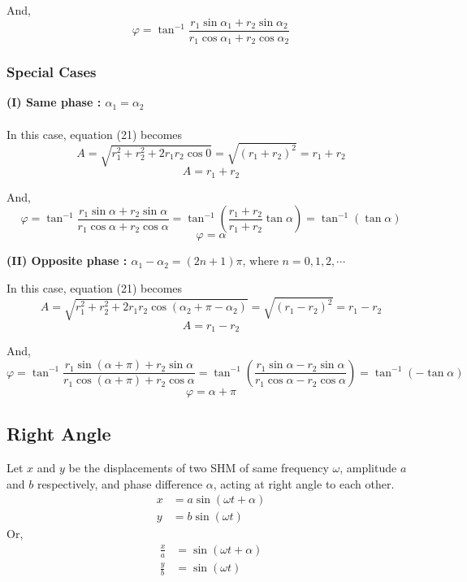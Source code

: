 \documentclass[12pt]{article}
\begin{document}
And,
\begin{equation}
    \boxed{ \varphi = \tan^{-1}{\frac{r_1 \sin{\alpha_1} + r_2 \sin{\alpha_2}}{r_1 \cos{\alpha_1} + r_2 \cos{\alpha_2}}} }
\end{equation}

\subsubsection{Special Cases}
\textbf{(I) Same phase : $\alpha_1 = \alpha_2$}\\~\\

In this case, equation (21) becomes \[
    A = \sqrt{r_1^2 + r_2^2 + 2r_1r_2 \cos{0}} = \sqrt{(r_1 + r_2)^2} = r_1 + r_2
\]
\begin{equation}
    \boxed{ A = r_1 + r_2 }
\end{equation}

And, \[
    \varphi = \tan^{-1}{\frac{r_1 \sin{\alpha} + r_2 \sin{\alpha}}{r_1 \cos{\alpha} + r_2 \cos{\alpha}}} = \tan^{-1}{\left( \frac{r_1 + r_2}{r_1 + r_2} \tan{\alpha} \right)} = \tan^{-1}{(\tan{\alpha})}
\]
\begin{equation}
    \boxed{ \varphi = \alpha }
\end{equation}

\textbf{(II) Opposite phase : $\alpha_1 - \alpha_2 = (2n+1)\pi \text{, where } n=0,1,2,\cdots$}

In this case, equation (21) becomes \[
    A = \sqrt{r_1^2 + r_2^2 + 2r_1r_2 \cos{(\alpha_2 + \pi - \alpha_2)}} = \sqrt{(r_1 - r_2)^2} = r_1 - r_2
\]
\begin{equation}
    \boxed{ A = r_1 - r_2 }
\end{equation}

And, \[
    \varphi = \tan^{-1}{\frac{r_1 \sin{(\alpha + \pi)} + r_2 \sin{\alpha}}{r_1 \cos{(\alpha + \pi)} + r_2 \cos{\alpha}}} = \tan^{-1}{\left( \frac{r_1 \sin{\alpha} - r_2 \sin{\alpha}}{r_1 \cos{\alpha} - r_2 \cos{\alpha}} \right)} = \tan^{-1}{(-\tan{\alpha})}
\]
\begin{equation}
    \boxed{ \varphi = \alpha + \pi }
\end{equation}


\subsection{Right Angle}
Let $x$ and $y$ be the displacements of two SHM of same frequency $\omega$, amplitude $a$ and $b$ respectively, and phase difference $\alpha$, acting at right angle to each other. \\
\begin{align}
    x &= a \sin{(\omega t + \alpha)} \\
    y &= b \sin{(\omega t)}
\end{align}
Or,
\begin{align}
    \frac{x}{a} &= \sin{(\omega t + \alpha)} \\
    \frac{y}{b} &= \sin{(\omega t)}
\end{align}
\end{document}
